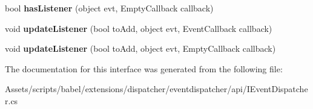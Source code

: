 \begin{DoxyCompactItemize}
\item 
\hypertarget{interfacebabel_1_1extensions_1_1dispatcher_1_1eventdispatcher_1_1api_1_1_i_event_dispatcher_ac0a3baded9a7501e426549677a0b415a}{bool {\bfseries has\-Listener} (object evt, Empty\-Callback callback)}\label{interfacebabel_1_1extensions_1_1dispatcher_1_1eventdispatcher_1_1api_1_1_i_event_dispatcher_ac0a3baded9a7501e426549677a0b415a}

\item 
\hypertarget{interfacebabel_1_1extensions_1_1dispatcher_1_1eventdispatcher_1_1api_1_1_i_event_dispatcher_a5d2befa659d1aca834821ce0988dc2c2}{void {\bfseries update\-Listener} (bool to\-Add, object evt, Event\-Callback callback)}\label{interfacebabel_1_1extensions_1_1dispatcher_1_1eventdispatcher_1_1api_1_1_i_event_dispatcher_a5d2befa659d1aca834821ce0988dc2c2}

\item 
\hypertarget{interfacebabel_1_1extensions_1_1dispatcher_1_1eventdispatcher_1_1api_1_1_i_event_dispatcher_a43b8e4ea52e4a93cd268c04b17cd792a}{void {\bfseries update\-Listener} (bool to\-Add, object evt, Empty\-Callback callback)}\label{interfacebabel_1_1extensions_1_1dispatcher_1_1eventdispatcher_1_1api_1_1_i_event_dispatcher_a43b8e4ea52e4a93cd268c04b17cd792a}

\end{DoxyCompactItemize}


The documentation for this interface was generated from the following file\-:\begin{DoxyCompactItemize}
\item 
Assets/scripts/babel/extensions/dispatcher/eventdispatcher/api/I\-Event\-Dispatcher.\-cs\end{DoxyCompactItemize}
